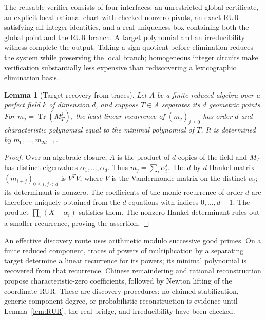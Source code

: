 \documentclass[11pt]{article}
\newtheorem{lemma}[theorem]{Lemma}
\begin{document}
The reusable verifier consists of four interfaces: an unrestricted global
certificate, an explicit local rational chart with checked nonzero pivots,
an exact RUR satisfying all integer identities, and a real uniqueness box
containing both the global point and the RUR branch. A target polynomial
and an irreducibility witness complete the output. Taking a sign quotient
before elimination reduces the system while preserving the local branch;
homogeneous integer circuits make verification substantially less expensive
than rediscovering a lexicographic elimination basis.

\begin{lemma}[Target recovery from traces]\label{lem:traces}
Let $A$ be a finite reduced algebra over a perfect field $k$ of dimension $d$,
and suppose $T\in A$ separates its $d$ geometric points. For
$m_j=\operatorname{Tr}(M_T^j)$, the least linear recurrence of
$(m_j)_{j\ge0}$ has order $d$ and characteristic polynomial equal to
the minimal polynomial of $T$. It is determined by $m_0,\ldots,m_{2d-1}$.
\end{lemma}
\begin{proof}
Over an algebraic closure, $A$ is the product of $d$ copies of the field
and $M_T$ has distinct eigenvalues $\alpha_1,\ldots,\alpha_d$.
Thus $m_j=\sum_i\alpha_i^j$. The $d$ by $d$ Hankel matrix
$(m_{i+j})_{0\le i,j<d}$ is $V^TV$, where $V$ is the Vandermonde
matrix on the distinct $\alpha_i$; its determinant is nonzero. The
coefficients of the monic recurrence of order $d$ are therefore uniquely
obtained from the $d$ equations with indices $0,\ldots,d-1$.
The product $\prod_i(X-\alpha_i)$ satisfies them. The nonzero Hankel
determinant rules out a smaller recurrence, proving the assertion.
\end{proof}

An effective discovery route uses arithmetic modulo successive good primes.
On a finite reduced component, traces of powers of multiplication by a
separating target determine a linear recurrence for its powers; its minimal
polynomial is recovered from that recurrence. Chinese remaindering and
rational reconstruction propose characteristic-zero coefficients, followed
by Newton lifting of the coordinate RUR. These are discovery procedures:
no claimed stabilization, generic component degree, or probabilistic
reconstruction is evidence until Lemma~\ref{lem:RUR}, the real bridge,
and irreducibility have been checked.
\end{document}
